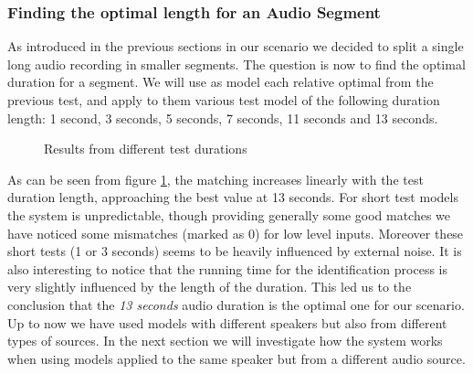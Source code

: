 \subsubsection{Finding the optimal length for an Audio Segment}

As introduced in the previous sections in our scenario we decided to split a single
long audio recording in smaller segments. The question is now to find the optimal duration
for a segment. We will use as model each relative optimal from the previous test, and apply to them
various test model of the following duration length: 1 second, 3 seconds, 5 seconds, 7 seconds,
11 seconds and 13 seconds.
\begin{figure}
\begin{center}


\caption{Results from different test durations}
\label{chart:score-test-dur}
\end{center}
\end{figure}

As can be seen from figure \ref{chart:score-test-dur}, the matching increases linearly with the test duration
length, approaching the best value at 13 seconds.\newline
For short test models the system is unpredictable, though providing generally some
good matches we have noticed some mismatches (marked as 0) for low level inputs. Moreover
these short tests (1 or 3 seconds) seems to be heavily influenced by external noise.\newline
It is also interesting to notice that the running time for the identification process is very slightly
influenced by the length of the duration. This led us to the conclusion that the \textit{13 seconds}
audio duration is the optimal one for our scenario.\newline
Up to now we have used models with different speakers but also from different types of sources. In the
next section we will investigate how the system works when using models applied to the same
speaker but from a different audio source.



